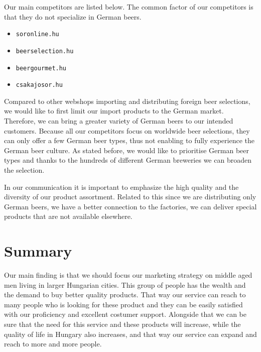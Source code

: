 Our main competitors are listed below. The common factor of our competitors is that they do not specialize in German beers.
\begin{itemize}
   \item \texttt{soronline.hu} \cite{soronline}
   \item \texttt{beerselection.hu} \cite{beerselection}
   \item \texttt{beergourmet.hu} \cite{beergourmet}
   \item \texttt{csakajosor.hu} \cite{csakajosor}
\end{itemize}
Compared to other webshops importing and distributing foreign beer selections, we would like to first limit our import products to the German market. Therefore, we can bring a greater variety of German beers to our intended customers. Because all our competitors focus on worldwide beer selections, they can only offer a few German beer types, thus not enabling to fully experience the German beer culture. As stated before, we would like to prioritise German beer types and thanks to the hundreds of different German breweries we can broaden the selection.

In our communication it is important to emphasize the high quality and the diversity of our product assortment. Related to this since we are distributing only German beers, we have a better connection to the factories, we can deliver special products that are not available elsewhere.


\section{Summary}
Our main finding is that we should focus our marketing strategy on middle aged men living in larger Hungarian cities. This group of people has the wealth and the demand to buy better quality products. That way our service can reach to many people who is looking for these product and they can be easily satisfied with our proficiency and excellent costumer support. Alongside that we can be sure that the need for this service and these products will increase, while the quality of life in Hungary also increases, and that way our service can expand and reach to more and more people. 


\newpage
\renewcommand{\baselinestretch}{1}

